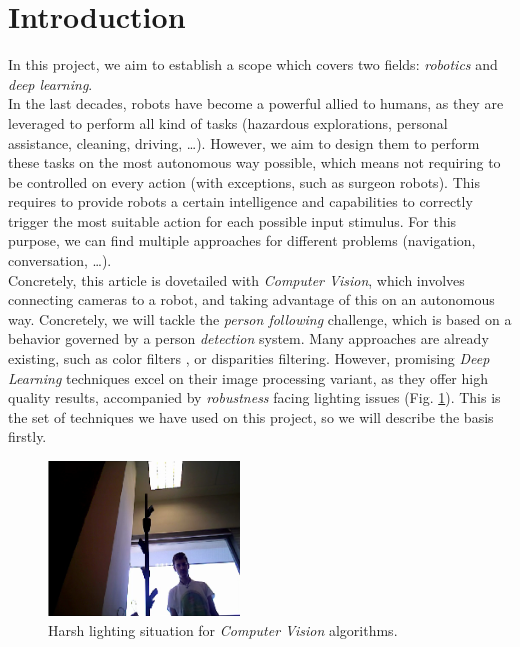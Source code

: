 \section{Introduction}
%
In this project, we aim to establish a scope which covers two fields: \emph{robotics} and \emph{deep learning}.\\

In the last decades, robots have become a powerful allied to humans, as they are leveraged to perform all kind of tasks (hazardous explorations, personal assistance, cleaning, driving, \dots). However, we aim to design them to perform these tasks on the most autonomous way possible, which means not requiring to be controlled on every action (with exceptions, such as surgeon robots). This requires to provide robots a certain intelligence and capabilities to correctly trigger the most suitable action for each possible input stimulus. For this purpose, we can find multiple approaches for different problems (navigation, conversation, \dots).\\

Concretely, this article is dovetailed with \emph{Computer Vision}, which involves connecting cameras to a robot, and taking advantage of this on an autonomous way. Concretely, we will tackle the \emph{person following} challenge, which is based on a behavior governed by a person \emph{detection} system. Many approaches are already existing, such as color filters \cite{rocapal}, or disparities filtering. However, promising \emph{Deep Learning} techniques excel on their image processing variant, as they offer high quality results, accompanied by \emph{robustness} facing lighting issues (Fig. \ref{fig:intro_harsh_light}). This is the set of techniques we have used on this project, so we will describe the basis firstly.\\

\begin{figure}[h]
	\centering
	\includegraphics[width=2in]{images/light_ko_2}
	\caption{Harsh lighting situation for \emph{Computer Vision} algorithms.}
	\label{fig:intro_harsh_light}
\end{figure}


